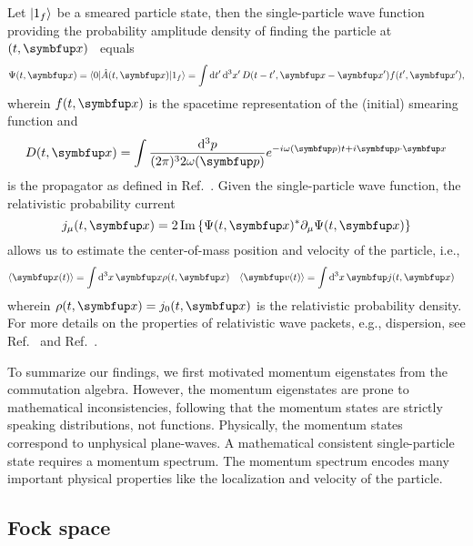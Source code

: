 Let $\lvert1_f\rangle$ be a smeared particle state, then the single-particle wave function providing the probability amplitude density of finding the particle at $(t,\vb{x})$~\cite[p.~24]{Peskin1995} equals
\begin{equation}
	\Psi(t,\vb{x})
	=
	\vacbra
	\hat{A}(t,\vb{x})
	\ket{1_f}
	=
	\int\dd{t^\prime}\dd[3]{x^\prime}
	D(t-t^\prime,\vb{x}-\vb{x}^\prime)
	f(t^\prime,\vb{x}^\prime)
	,
\end{equation}
wherein $f(t,\vb{x})$ is the spacetime representation of the (initial) smearing function and
\begin{equation}
	D(t,\vb{x})
	=
	\int\frac{\dd[3]{p}}{(2\pi)^32\omega(\vb{p})}
	e^{-i\omega(\vb{p})t+i\vb{p}\vdot\vb{x}}
\end{equation}
is the propagator as defined in Ref.~\cite[p.~27]{Peskin1995}.
Given the single-particle wave function, the relativistic probability current
\begin{equation}
	j_\mu(t,\vb{x})
	=
	2\Im\left\{
		\Psi(t,\vb{x})^*
		\partial_\mu
		\Psi(t,\vb{x})
	\right\}
\end{equation}
allows us to estimate the center-of-mass position and velocity of the particle, i.e.,
\begin{align}
	\expval{\vb{x}(t)}
	&=
	\int\dd[3]{x}
	\vb{x}
	\rho(t,\vb{x})
	&
	\expval{\vb{v}(t)}
	&=
	\int\dd[3]{x}
	\vb{j}(t,\vb{x})
\end{align}
wherein $\rho(t,\vb{x})=j_0(t,\vb{x})$ is the relativistic probability density.
For more details on the properties of relativistic wave packets, e.g., dispersion, see Ref.~\cite{Naumov2013} and Ref.~\cite{Naumov2009}.

To summarize our findings, we first motivated momentum eigenstates from the commutation algebra.
However, the momentum eigenstates are prone to mathematical inconsistencies, following that the momentum states are strictly speaking distributions, not functions.
Physically, the momentum states correspond to unphysical plane-waves.
A mathematical consistent single-particle state requires a momentum spectrum.
The momentum spectrum encodes many important physical properties like the localization and velocity of the particle.

\subsection{Fock space}

